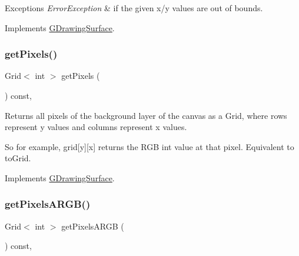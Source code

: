 \begin{DoxyExceptions}{Exceptions}
{\em Error\+Exception} & if the given x/y values are out of bounds. \\
\hline
\end{DoxyExceptions}


Implements \mbox{\hyperlink{classGDrawingSurface_aee10de1ca7da1fc3f3fc0e48286f88f8}{G\+Drawing\+Surface}}.

\mbox{\label{classGCanvas_aec81bf7947e993d8df8039e19dbac533}} 
\subsubsection{\texorpdfstring{get\+Pixels()}{getPixels()}}
{\footnotesize\ttfamily Grid$<$ int $>$ get\+Pixels (\begin{DoxyParamCaption}{ }\end{DoxyParamCaption}) const\hspace{0.3cm}{\ttfamily [override]}, {\ttfamily [virtual]}}



Returns all pixels of the background layer of the canvas as a Grid, where rows represent y values and columns represent x values. 

So for example, grid\mbox{[}y\mbox{]}\mbox{[}x\mbox{]} returns the R\+GB int value at that pixel. Equivalent to to\+Grid. 

Implements \mbox{\hyperlink{classGDrawingSurface_a9811240b1241922153dec17d395797cf}{G\+Drawing\+Surface}}.

\mbox{\label{classGCanvas_aa1626b73d6dae452e9e78c159411058b}} 
\subsubsection{\texorpdfstring{get\+Pixels\+A\+R\+G\+B()}{getPixelsARGB()}}
{\footnotesize\ttfamily Grid$<$ int $>$ get\+Pixels\+A\+R\+GB (\begin{DoxyParamCaption}{ }\end{DoxyParamCaption}) const\hspace{0.3cm}{\ttfamily [override]}, {\ttfamily [virtual]}}



